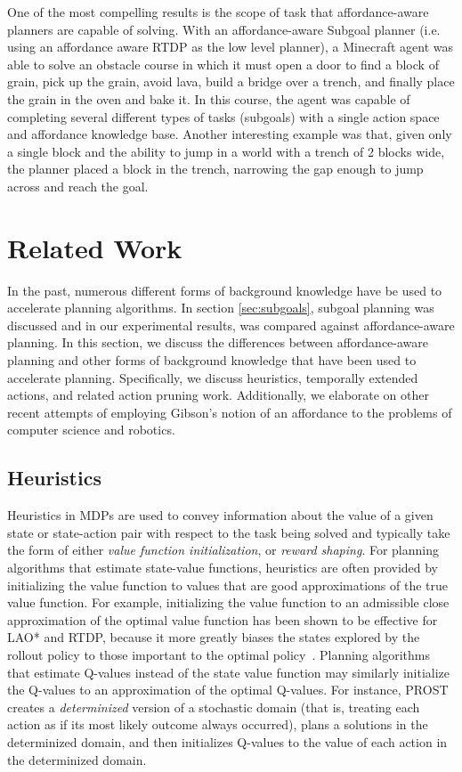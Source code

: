 \documentclass[]{article}
\begin{document}
One of the most compelling results is the scope of task that affordance-aware planners are capable of solving. With an affordance-aware Subgoal planner (i.e. using an affordance aware RTDP as the low level planner), a Minecraft agent was able to solve an obstacle course in which it must open a door to find a block of grain, pick up the grain, avoid lava, build a bridge over a trench, and finally place the grain in the oven and bake it. In this course, the agent was capable of completing several different types of tasks (subgoals) with a single action space and affordance knowledge base. Another interesting example was that, given only a single block and the ability to jump in a world with a trench of 2 blocks wide,
the planner placed a block in the trench, narrowing the gap enough to jump across and reach the goal.



\section{Related Work}
In the past, numerous different forms of background knowledge have be used to 
accelerate planning algorithms. In section \ref{sec:subgoals}, subgoal
planning was discussed and in our experimental results, was compared against affordance-aware planning. 
In this section, we discuss the differences between affordance-aware planning and other
forms of background knowledge that have been used to accelerate planning.
Specifically, we discuss heuristics, temporally extended actions, and related action pruning work.
Additionally, we elaborate on other recent attempts of employing Gibson's notion of an affordance 
to the problems of computer science and robotics.


\subsection{Heuristics}
Heuristics in MDPs are used to convey information about the value of a given state or state-action pair with respect to the task being solved and typically take the form of either {\em value function initialization},
or {\em reward shaping}. For planning algorithms that estimate state-value functions, heuristics are often
provided by initializing the value function to values that are good approximations of the true value function. For example, initializing the value function to an admissible close approximation of the optimal value function has been shown to be effective for LAO* and RTDP, because it more greatly biases the states explored by the rollout policy to those important to the optimal policy~\cite{Hansen:1999qf}. Planning algorithms that estimate Q-values instead of the state value function may similarly initialize the Q-values to an approximation of the optimal Q-values. For instance, PROST~\cite{keller2012prost} creates a {\em determinized} version of a stochastic domain (that is, treating each action as if its most likely outcome always occurred), plans a solutions in the determinized domain, and then initializes Q-values to the value of each action in the determinized domain.
\end{document}
